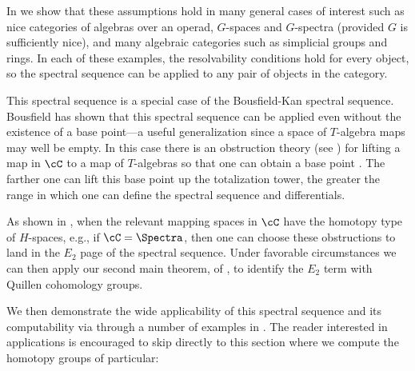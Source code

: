 \documentclass[leqno,oneside,english]{elsarticle}
\begin{document}
In  we show that these assumptions
hold in many general cases of interest such as nice categories of
algebras over an operad, $G$-spaces and $G$-spectra (provided $G$ is
sufficiently nice), and many algebraic categories such as simplicial
groups and rings.  In each of these examples, the resolvability conditions hold for every object, so the spectral sequence can be applied to any pair of objects in the category. 

This spectral sequence is a special case of the Bousfield-Kan spectral sequence. Bousfield has shown that this spectral sequence can be applied even without the existence of a base point---a useful generalization
since a space of $T$-algebra maps may well be empty. In this case
there is an obstruction theory (see ) for
lifting a map in $\cC$ to a map of $T$-algebras so that one can obtain
a base point \cite[\S~5]{Bou89}. The farther one can lift this base
point up the totalization tower, the greater the range in which one
can define the spectral sequence and differentials.

As shown in , when the relevant mapping spaces in
$\cC$ have the homotopy type of $H$-spaces, e.g., if $\cC=\Spectra$,
then one can choose these obstructions to land in the $E_2$ page of the
spectral sequence. Under favorable circumstances we can then apply our second
main theorem,  of , to identify the
$E_2$ term with Quillen cohomology groups.

We then demonstrate the wide applicability of this spectral sequence and its
computability via  through a number of examples in .
The reader interested in applications is encouraged to skip directly to
this section where we compute the homotopy groups of particular:
\end{document}
